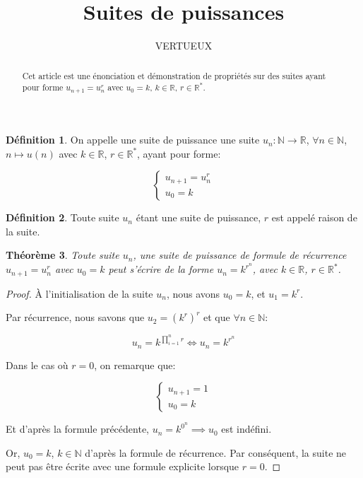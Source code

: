 \documentclass{amsart}
\newtheorem{theorem}{Théorème}[section]
\theoremstyle{definition}
\newtheorem{definition}[theorem]{Définition}
\theoremstyle{remark}
\numberwithin{equation}{section}
\begin{document}
\title{Suites de puissances}

\author{VERTUEUX}

\begin{abstract}
    Cet article est une énonciation et démonstration de propriétés sur des suites ayant pour forme $u_{n+1}=u_n^r$ avec $u_0=k$, $k \in \mathbb{R}$, $r \in \mathbb{R^*}$.
\end{abstract}

\maketitle

\begin{definition}
    On appelle une suite de puissance une suite $u_n:\mathbb{N} \rightarrow \mathbb{R}$, $\forall n \in \mathbb{N}$, $n \mapsto u(n)$ avec $k \in \mathbb{R}$, $r \in \mathbb{R^*}$, ayant pour forme: 

    \[\begin{cases} 
        u_{n+1}=u_n^r \\
        u_0=k
    \end{cases}\]
\end{definition}

\begin{definition}
    Toute suite $u_n$ étant une suite de puissance, $r$ est appelé raison de la suite.
\end{definition}

\begin{theorem}
    Toute suite $u_n$, une suite de puissance de formule de récurrence $u_{n+1}=u_n^r$ avec $u_0=k$ peut s'écrire de la forme $u_n=k^{r^n}$, avec $k \in \mathbb{R}$, $r \in \mathbb{R^*}$.
\end{theorem}

\begin{proof}
    À l'initialisation de la suite $u_n$, nous avons $u_0 = k$, et $u_1 = k^r$.

    Par récurrence, nous savons que $u_2 = (k^r)^r$ et que $\forall n \in \mathbb{N}$:
    
    \[u_n = k^{\prod_{i=1}^{n}r} \iff u_n = k^{r^n}\]

    Dans le cas où $r = 0$, on remarque que: 

    \[\begin{cases} 
        u_{n+1}=1 \\
        u_0=k
    \end{cases}\]

    Et d'après la formule précédente, $u_n = k^{0^n} \implies u_0$ est indéfini.

    Or, $u_0 = k$, $k \in \mathbb{N}$ d'après la formule de récurrence. Par conséquent, la suite ne peut pas être écrite avec une formule explicite lorsque $r=0$.

\end{proof} 
\end{document}
